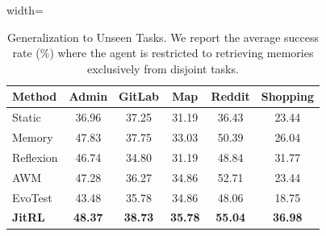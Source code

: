 

\begin{table}[t]
  \caption{Generalization to Unseen Tasks. We report the average success rate (\%) where the agent is restricted to retrieving memories exclusively from disjoint tasks.}
  \label{tab:first_run_comparison}
  \begin{center}
    \begin{small}
      \begin{adjustbox}{width=\columnwidth}
      \begin{tabular}{lccccc}
        \toprule
        \textbf{Method} & \textbf{Admin} & \textbf{GitLab} & \textbf{Map} & \textbf{Reddit} & \textbf{Shopping} \\
        \midrule
        Static & 36.96 & 37.25 & 31.19 & 36.43 & 23.44 \\
        Memory & 47.83 & 37.75 & 33.03 & 50.39 & 26.04 \\
        Reflexion & 46.74 & 34.80 & 31.19 & 48.84 & 31.77 \\
        AWM & 47.28 & 36.27 & 34.86 & 52.71 & 23.44 \\
        EvoTest & 43.48 & 35.78 & 34.86 & 48.06 & 18.75 \\
        \midrule
        \textbf{JitRL} & \textbf{48.37} & \textbf{38.73} & \textbf{35.78} & \textbf{55.04} & \textbf{36.98} \\
        \bottomrule
      \end{tabular}
      \end{adjustbox}
    \end{small}
  \end{center}
\end{table}


